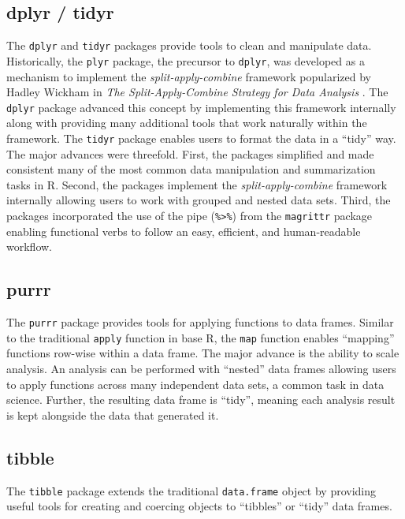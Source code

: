\subsection{dplyr / tidyr}\label{dplyr-tidyr}

The \texttt{dplyr} and \texttt{tidyr} packages provide tools to clean
and manipulate data. Historically, the \texttt{plyr} package, the
precursor to \texttt{dplyr}, was developed as a mechanism to implement
the \emph{split-apply-combine} framework popularized by Hadley Wickham
in \emph{The Split-Apply-Combine Strategy for Data Analysis}
\citep{plyr}. The \texttt{dplyr} package advanced this concept by
implementing this framework internally along with providing many
additional tools that work naturally within the framework. The
\texttt{tidyr} package enables users to format the data in a ``tidy''
way. The major advances were threefold. First, the packages simplified
and made consistent many of the most common data manipulation and
summarization tasks in R. Second, the packages implement the
\emph{split-apply-combine} framework internally allowing users to work
with grouped and nested data sets. Third, the packages incorporated the
use of the pipe (\texttt{\%\textgreater{}\%}) from the \texttt{magrittr}
package enabling functional verbs to follow an easy, efficient, and
human-readable workflow.

\subsection{purrr}\label{purrr}

The \texttt{purrr} package provides tools for applying functions to data
frames. Similar to the traditional \texttt{apply} function in base R,
the \texttt{map} function enables ``mapping'' functions row-wise within
a data frame. The major advance is the ability to scale analysis. An
analysis can be performed with ``nested'' data frames allowing users to
apply functions across many independent data sets, a common task in data
science. Further, the resulting data frame is ``tidy'', meaning each
analysis result is kept alongside the data that generated it.

\subsection{tibble}\label{tibble}

The \texttt{tibble} package extends the traditional \texttt{data.frame}
object by providing useful tools for creating and coercing objects to
``tibbles'' or ``tidy'' data frames.

